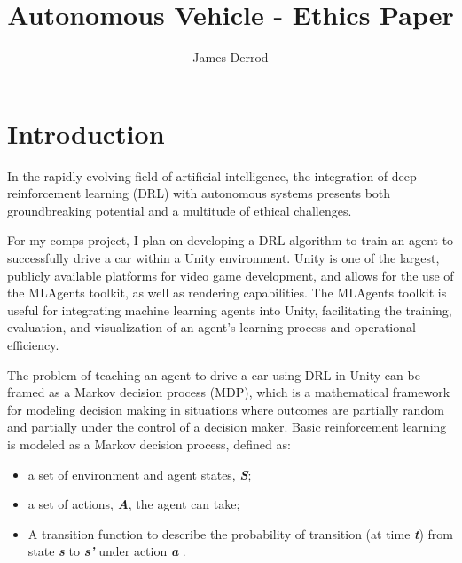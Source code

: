 \documentclass[10pt,twocolumn]{article}
\title{Autonomous Vehicle - Ethics Paper}
\author{James Derrod}
\affiliation{Occidental College}
\begin{document}
\maketitle

\section{Introduction} In the rapidly evolving field of artificial intelligence, the integration of deep reinforcement learning (DRL) with autonomous systems presents both groundbreaking potential and a multitude of ethical challenges. 

For my comps project, I plan on developing a DRL algorithm to train an agent to successfully drive a car within a Unity environment. Unity is one of the largest, publicly available platforms for video game development, and allows for the use of the MLAgents toolkit, as well as rendering capabilities. The MLAgents toolkit is useful for integrating machine learning agents into Unity, facilitating the training, evaluation, and visualization of an agent's learning process and operational efficiency.

The problem of teaching an agent to drive a car using DRL in Unity can be framed as a Markov decision process (MDP), which is a mathematical framework for modeling decision making in situations where outcomes are partially random and partially under the control of a decision maker. Basic reinforcement learning is modeled as a Markov decision process, defined as:
\begin{itemize}
    \item a set of environment and agent states, \textbf{\textit{S}};
    \item a set of actions, \textbf{\textit{A}}, the agent can take;
    \item A transition function to describe the probability of transition (at time \textbf{\textit{t}}) from state \textbf{\textit{s}} to \textbf{\textit{s'}} under action \textbf{\textit{a}} \cite{MarkovDecisionProcess}.
\end{itemize}
\end{document}

